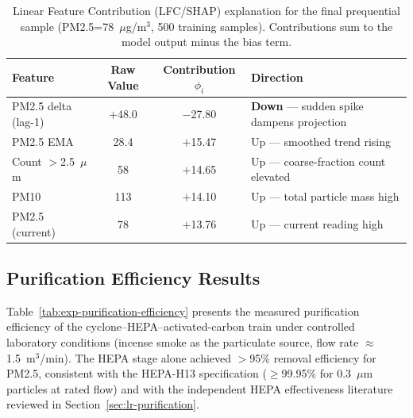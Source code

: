 \begin{table}[htbp]
\centering
\caption{Linear Feature Contribution (LFC/SHAP) explanation for the final prequential sample (PM2.5=78~$\mu$g/m$^3$, 500 training samples). Contributions sum to the model output minus the bias term.}
\label{tab:xai-example-result}
\small
\begin{tabular}{@{}lccl@{}}
\toprule
\textbf{Feature} & \textbf{Raw Value} & \textbf{Contribution $\phi_i$} & \textbf{Direction} \\
\midrule
PM2.5 delta (lag-1) & $+$48.0 & $-$27.80 & \textbf{Down} — sudden spike dampens projection \\
PM2.5 EMA           & 28.4    & $+$15.47 & Up — smoothed trend rising \\
Count $>$2.5~$\mu$m & 58      & $+$14.65 & Up — coarse-fraction count elevated \\
PM10                & 113     & $+$14.10 & Up — total particle mass high \\
PM2.5 (current)     & 78      & $+$13.76 & Up — current reading high \\
\bottomrule
\end{tabular}
\end{table}

\FloatBarrier

\subsection{Purification Efficiency Results}
\label{sec:exp-purification-result}

Table~\ref{tab:exp-purification-efficiency} presents the measured purification efficiency of the cyclone--HEPA--activated-carbon train under controlled laboratory conditions (incense smoke as the particulate source, flow rate $\approx$ 1.5~m$^3$/min). The HEPA stage alone achieved $>$95\% removal efficiency for PM2.5, consistent with the HEPA-H13 specification ($\geq$99.95\% for 0.3~$\mu$m particles at rated flow) and with the independent HEPA effectiveness literature reviewed in Section~\ref{sec:lr-purification}.

